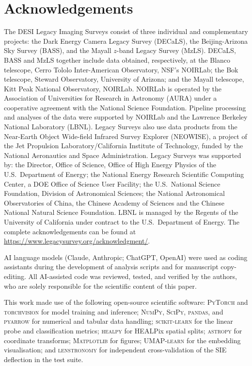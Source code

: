 \documentclass[fleqn,usenatbib]{mnras}
\begin{document}
\section*{Acknowledgements}
The DESI Legacy Imaging Surveys consist of three individual and
complementary projects: the Dark Energy Camera Legacy Survey (DECaLS),
the Beijing-Arizona Sky Survey (BASS), and the Mayall $z$-band Legacy
Survey (MzLS).  DECaLS, BASS and MzLS together include data obtained,
respectively, at the Blanco telescope, Cerro Tololo Inter-American
Observatory, NSF's NOIRLab; the Bok telescope, Steward Observatory,
University of Arizona; and the Mayall telescope, Kitt Peak National
Observatory, NOIRLab.  NOIRLab is operated by the Association of
Universities for Research in Astronomy (AURA) under a cooperative
agreement with the National Science Foundation.  Pipeline processing and
analyses of the data were supported by NOIRLab and the Lawrence Berkeley
National Laboratory (LBNL).  Legacy Surveys also use data products from
the Near-Earth Object Wide-field Infrared Survey Explorer (NEOWISE), a
project of the Jet Propulsion Laboratory/California Institute of
Technology, funded by the National Aeronautics and Space Administration.
Legacy Surveys was supported by: the Director, Office of Science, Office
of High Energy Physics of the U.S.\ Department of Energy; the National
Energy Research Scientific Computing Center, a DOE Office of Science
User Facility; the U.S.\ National Science Foundation, Division of
Astronomical Sciences; the National Astronomical Observatories of China,
the Chinese Academy of Sciences and the Chinese National Natural Science
Foundation.  LBNL is managed by the Regents of the University of
California under contract to the U.S.\ Department of Energy.  The
complete acknowledgements can be found at
\url{https://www.legacysurvey.org/acknowledgment/}.

AI language models (Claude, Anthropic; ChatGPT, OpenAI) were used as
coding assistants during the development of analysis scripts and for
manuscript copy-editing.  All AI-assisted code was reviewed, tested, and
verified by the authors, who are solely responsible for the scientific
content of this paper.

This work made use of the following open-source scientific software:
\textsc{PyTorch} and \textsc{torchvision} for model training and inference;
\textsc{NumPy}, \textsc{SciPy}, \textsc{pandas}, and \textsc{pyarrow} for
numerical and tabular data handling; \textsc{scikit-learn} for the linear
probe and classification metrics; \textsc{healpy} for HEALPix spatial
splits; \textsc{astropy} for coordinate transforms; \textsc{Matplotlib}
for figures; \textsc{UMAP-learn} for the embedding visualisation; and
\textsc{lenstronomy} for independent cross-validation of the SIE
deflection in the test suite.
\end{document}
